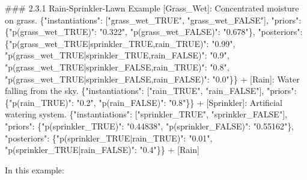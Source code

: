 \documentclass[
  11pt,
  letterpaper,
]{book}
\newenvironment{Shaded}{\begin{snugshade}}{\end{snugshade}}
\newcommand{\DataTypeTok}[1]{\textcolor[rgb]{0.68,0.00,0.00}{#1}}
\newcommand{\ErrorTok}[1]{\textcolor[rgb]{0.68,0.00,0.00}{#1}}
\newcommand{\FunctionTok}[1]{\textcolor[rgb]{0.28,0.35,0.67}{#1}}
\newcommand{\OtherTok}[1]{\textcolor[rgb]{0.00,0.23,0.31}{#1}}
\newcommand{\StringTok}[1]{\textcolor[rgb]{0.13,0.47,0.30}{#1}}
\begin{document}
\begin{Shaded}
\begin{Highlighting}[]
\ErrorTok{\#\#\#} \ErrorTok{2.3.1} \ErrorTok{Rain{-}Sprinkler{-}Lawn} \ErrorTok{Example}
\OtherTok{[}\ErrorTok{Grass\_Wet}\OtherTok{]}\ErrorTok{:} \ErrorTok{Concentrated} \ErrorTok{moisture} \ErrorTok{on} \ErrorTok{grass.} \FunctionTok{\{}\DataTypeTok{"instantiations"}\FunctionTok{:} \OtherTok{[}\StringTok{"grass\_wet\_TRUE"}\OtherTok{,} \StringTok{"grass\_wet\_FALSE"}\OtherTok{]}\FunctionTok{,}
\DataTypeTok{"priors"}\FunctionTok{:} \FunctionTok{\{}\DataTypeTok{"p(grass\_wet\_TRUE)"}\FunctionTok{:} \StringTok{"0.322"}\FunctionTok{,} \DataTypeTok{"p(grass\_wet\_FALSE)"}\FunctionTok{:} \StringTok{"0.678"}\FunctionTok{\},}
\DataTypeTok{"posteriors"}\FunctionTok{:} \FunctionTok{\{}\DataTypeTok{"p(grass\_wet\_TRUE|sprinkler\_TRUE,rain\_TRUE)"}\FunctionTok{:} \StringTok{"0.99"}\FunctionTok{,}
\DataTypeTok{"p(grass\_wet\_TRUE|sprinkler\_TRUE,rain\_FALSE)"}\FunctionTok{:} \StringTok{"0.9"}\FunctionTok{,}
\DataTypeTok{"p(grass\_wet\_TRUE|sprinkler\_FALSE,rain\_TRUE)"}\FunctionTok{:} \StringTok{"0.8"}\FunctionTok{,}
\DataTypeTok{"p(grass\_wet\_TRUE|sprinkler\_FALSE,rain\_FALSE)"}\FunctionTok{:} \StringTok{"0.0"}\FunctionTok{\}\}}
 \ErrorTok{+} \OtherTok{[}\ErrorTok{Rain}\OtherTok{]}\ErrorTok{:} \ErrorTok{Water} \ErrorTok{falling} \ErrorTok{from} \ErrorTok{the} \ErrorTok{sky.} \FunctionTok{\{}\DataTypeTok{"instantiations"}\FunctionTok{:} \OtherTok{[}\StringTok{"rain\_TRUE"}\OtherTok{,} \StringTok{"rain\_FALSE"}\OtherTok{]}\FunctionTok{,}
 \DataTypeTok{"priors"}\FunctionTok{:} \FunctionTok{\{}\DataTypeTok{"p(rain\_TRUE)"}\FunctionTok{:} \StringTok{"0.2"}\FunctionTok{,} \DataTypeTok{"p(rain\_FALSE)"}\FunctionTok{:} \StringTok{"0.8"}\FunctionTok{\}\}}
 \ErrorTok{+} \OtherTok{[}\ErrorTok{Sprinkler}\OtherTok{]}\ErrorTok{:} \ErrorTok{Artificial} \ErrorTok{watering} \ErrorTok{system.} \FunctionTok{\{}\DataTypeTok{"instantiations"}\FunctionTok{:} \OtherTok{[}\StringTok{"sprinkler\_TRUE"}\OtherTok{,} \StringTok{"sprinkler\_FALSE"}\OtherTok{]}\FunctionTok{,}
 \DataTypeTok{"priors"}\FunctionTok{:} \FunctionTok{\{}\DataTypeTok{"p(sprinkler\_TRUE)"}\FunctionTok{:} \StringTok{"0.44838"}\FunctionTok{,} \DataTypeTok{"p(sprinkler\_FALSE)"}\FunctionTok{:} \StringTok{"0.55162"}\FunctionTok{\},}
 \DataTypeTok{"posteriors"}\FunctionTok{:} \FunctionTok{\{}\DataTypeTok{"p(sprinkler\_TRUE|rain\_TRUE)"}\FunctionTok{:} \StringTok{"0.01"}\FunctionTok{,} \DataTypeTok{"p(sprinkler\_TRUE|rain\_FALSE)"}\FunctionTok{:} \StringTok{"0.4"}\FunctionTok{\}\}}
   \ErrorTok{+} \OtherTok{[}\ErrorTok{Rain}\OtherTok{]}


\ErrorTok{In} \ErrorTok{this} \ErrorTok{example:}


\end{Highlighting}
\end{Shaded}
\end{document}
